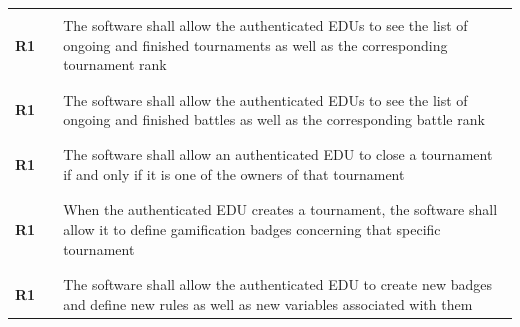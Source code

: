 \begin{table}[H]
\begin{tabular}{l l p{12cm}}
                    &        &                                                                                                                                                                         \\\hline & & \\
        \textbf{R1} & \vline & The software shall allow the authenticated EDUs to see the list of ongoing and finished tournaments as well as the corresponding tournament rank                        \\
                     &        &                                                                                                                                                                         \\\hline & & \\
        \textbf{R1} & \vline & The software shall allow the authenticated EDUs to see the list of ongoing and finished battles as well as the corresponding battle rank                                \\
                     &        &                                                                                                                                                                         \\\hline & & \\
        \textbf{R1} & \vline & The software shall allow an authenticated EDU to close a tournament if and only if it is one of the owners of that tournament                                           \\
                     &        &                                                                                                                                                                         \\\hline & & \\
        \textbf{R1} & \vline & When the authenticated EDU creates a tournament, the software shall allow it to define gamification badges concerning that specific tournament                          \\
                     &        &                                                                                                                                                                         \\\hline & & \\
        \textbf{R1} & \vline & The software shall allow the authenticated EDU to create new badges and define new rules as well as new variables associated with them                                  \\

\end{tabular}
\end{table}
